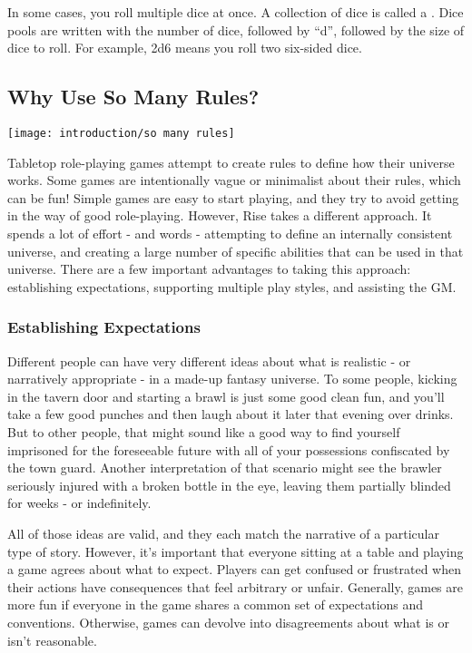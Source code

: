     In some cases, you roll multiple dice at once.
    A collection of dice is called a .
    Dice pools are written with the number of dice, followed by ``d'', followed by the size of dice to roll.
    For example, 2d6 means you roll two six-sided dice.

  \subsection{Why Use So Many Rules?}
    \texttt{[image: introduction/so many rules]}

    Tabletop role-playing games attempt to create rules to define how their universe works.
    Some games are intentionally vague or minimalist about their rules, which can be fun!
    Simple games are easy to start playing, and they try to avoid getting in the way of good role-playing.
    However, Rise takes a different approach.
    It spends a lot of effort - and words - attempting to define an internally consistent universe, and creating a large number of specific abilities that can be used in that universe.
    There are a few important advantages to taking this approach: establishing expectations, supporting multiple play styles, and assisting the GM.

    \subsubsection{Establishing Expectations}
      Different people can have very different ideas about what is realistic - or narratively appropriate - in a made-up fantasy universe.
      To some people, kicking in the tavern door and starting a brawl is just some good clean fun, and you'll take a few good punches and then laugh about it later that evening over drinks.
      But to other people, that might sound like a good way to find yourself imprisoned for the foreseeable future with all of your possessions confiscated by the town guard.
      Another interpretation of that scenario might see the brawler seriously injured with a broken bottle in the eye, leaving them partially blinded for weeks - or indefinitely.

      All of those ideas are valid, and they each match the narrative of a particular type of story.
      However, it's important that everyone sitting at a table and playing a game agrees about what to expect.
      Players can get confused or frustrated when their actions have consequences that feel arbitrary or unfair.
      Generally, games are more fun if everyone in the game shares a common set of expectations and conventions.
      Otherwise, games can devolve into disagreements about what is or isn't reasonable.

